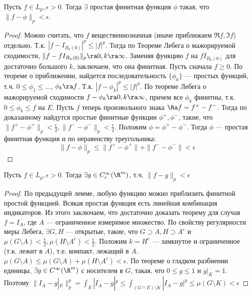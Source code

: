 \begin{lemma}
    Пусть \(f \in L_p, \epsilon > 0\). Тогда \(\exists\) простая финитная функция \(\phi\) такая, что \(\|f - \phi\|_p < \epsilon\).
\end{lemma}
\begin{proof}
    Можно считать, что \(f\) вещественнозначная (иначе приближаем \(\Re f, \Im f\)) отдельно. Т.к. \(|f - I_{B_k(0)}|^p \le |f|^p\). Тогда по Теореме Лебега о мажорируемой сходимости, \(\|f - fI_{B_k(0)}\|_p \ra 0, k \ra \infty\). Заменяя функцию \(f\) на \(fI_{B_k(0)}\) для достаточно большого \(k\), заключаем, что она финитная. Пусть сначала \(f \ge 0\). По теореме о приближении, найдется последовательность \(\{\phi_k\}\) --- простых функций, т.ч. \(0 \le \phi_1 \le \dots \), \(\phi_k \ra f\). Т.к. \(|f - \phi_k|^p \le |f|^p\). По теореме Лебега о мажорируемой сходимости \(f - \phi_k \ra 0, k \ra \infty\), причем все \(\phi_k\) финитны, т.к. \(0 \le \phi_k \le f\) на \(E\). Пусть \(f\) теперь произвольного знака \(\Ra f = f^+ - f^-\). Тогда по доказанному найдутся простые финитные функции \(\phi^+, \phi^-\), такие, что \(\|f^+ - \phi^+\|_p < \frac{\epsilon}{2}, \|f^- - \phi^-\|_p < \frac{\epsilon}{2}\). Положим \(\phi = \phi^+ - \phi^-\). Тогда \(\phi\) --- простая финитная функция и по неравенству треугольника:
    \[\|f - \phi\|_p \le \|f^+ - \phi^+\| + \|f^- - \phi^-\| < \epsilon\]
\end{proof}

\begin{theorem}
    Пусть \(f \in L_p, \epsilon > 0\). Тогда \(\exists g \in C_c^\infty(\R^m)\), т.ч. \(\|f - g\|_p < \epsilon\)
\end{theorem}
\begin{proof}
    По предыдущей лемме, любую функцию можно приблизить финитной простой функцией. Всякая простая функция есть линейная комбинация индикаторов. Из этого заключаем, что достаточно доказать теорему для случая \(f = I_A\), где \(A\) --- ограниченное измеримое множество. По свойству регулярности меры Лебега, \(\exists G, H\) --- открытые, такие, что \(G \supset A, H \supset A^c\) и \(\mu(G \setminus A) < \frac{\epsilon}{2}, \mu(H \setminus A^c) < \frac{\epsilon}{2}\). Положим \(k = H^c\) --- замкнутое и ограниченное (т.к. лежит в \(A\)), т.е. компакт, лежащий в \(A\). \(\mu(G \setminus A) \le \mu(G \setminus A) + \mu(H \setminus A^c) < \epsilon\). По теореме о гладком разбиении единицы, \(\exists g \in C^\infty(\R^m)\) с носителем в \(G\), такая, что \(0 \le g \le 1\) и \(g|_K = 1\). Поэтому \(\|I_A - g|_E\|_p^p = \int_E |I_A - g|^p \le \int_{(G \cap E) \setminus K} |I_A - g|^p \le \mu(G \setminus K) < \epsilon\)
\end{proof}

